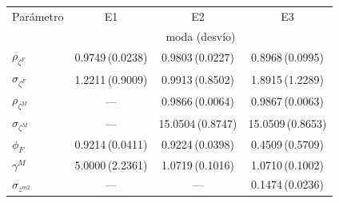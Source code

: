 \begin{tabular}{@{}lccc@{}}
\toprule
Par\'ametro & E1 & E2 & E3 \\
 & \multicolumn{3}{c}{\footnotesize moda (desv\'io)} \\
\midrule
$\rho_{\zeta^F}$ & 0.9749\,(0.0238) & 0.9803\,(0.0227) & 0.8968\,(0.0995) \\
$\sigma_{\zeta^F}$ & 1.2211\,(0.9009) & 0.9913\,(0.8502) & 1.8915\,(1.2289) \\
$\rho_{\zeta^M}$ & --- & 0.9866\,(0.0064) & 0.9867\,(0.0063) \\
$\sigma_{\zeta^M}$ & --- & 15.0504\,(0.8747) & 15.0509\,(0.8653) \\
$\phi_F$ & 0.9214\,(0.0411) & 0.9224\,(0.0398) & 0.4509\,(0.5709) \\
$\gamma^M$ & 5.0000\,(2.2361) & 1.0719\,(0.1016) & 1.0710\,(0.1002) \\
$\sigma_{z^{m2}}$ & --- & --- & 0.1474\,(0.0236) \\
\bottomrule
\end{tabular}
